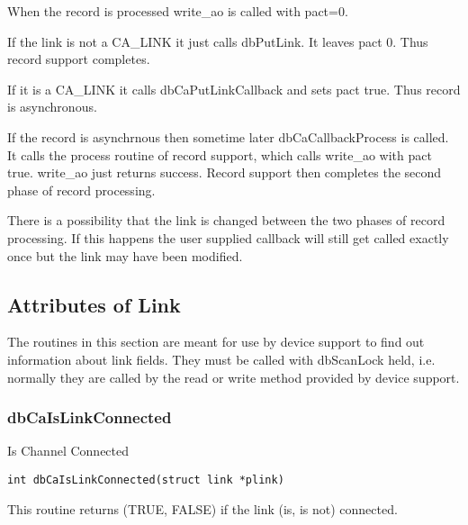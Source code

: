 \begin{description}

\item When the record is processed write\_ao is called with pact=0.

\begin{description}

\item If the link is not a CA\_LINK it just calls dbPutLink. It leaves pact 0. Thus record support completes.

\item If it is a CA\_LINK it calls dbCaPutLinkCallback and sets pact true. Thus record is asynchronous.

\end{description}

\item If the record is asynchrnous then sometime later dbCaCallbackProcess is called. It calls the process routine of record support, which calls write\_ao with pact true. write\_ao just returns success. Record support then completes the second phase of record processing.

\end{description}

There is a possibility that the link is changed between the two phases of record processing. If this happens the user supplied callback will still get called exactly once but the link may have been modified.

\subsection{Attributes of Link}

The routines in this section are meant for use by device support to find out information about link fields. They must be 
called with dbScanLock held, i.e. normally they are called by the read or write method provided by device support.

\subsubsection{dbCaIsLinkConnected}

Is Channel Connected

\begin{verbatim}int dbCaIsLinkConnected(struct link *plink)
\end{verbatim}This routine returns (TRUE, FALSE) if the link (is, is not) connected.

